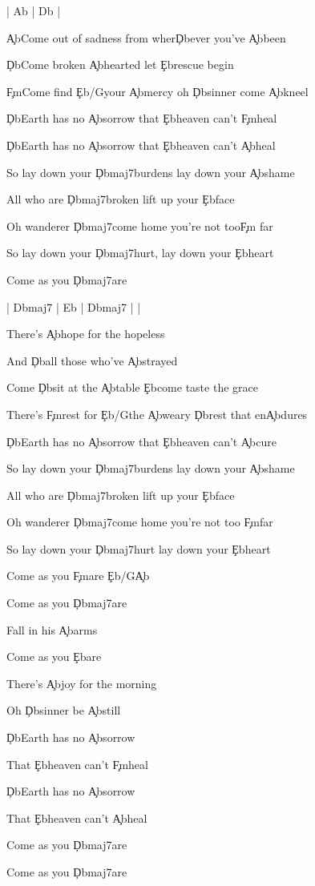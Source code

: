 \documentclass[9pt]{extarticle}
\begin{document}
\bsong

\bi
| Ab | Db |
\ei

\bv
\c{Ab}Come out of sadness from wher\c{Db}ever you've \c{Ab}been

\c{Db}Come broken \c{Ab}hearted let \c{Eb}rescue begin

\c{Fm}Come find \c{Eb/G}your \c{Ab}mercy oh \c{Db}sinner come \c{Ab}kneel

\c{Db}Earth has no \c{Ab}sorrow that \c{Eb}heaven can't \c{Fm}heal

\c{Db}Earth has no \c{Ab}sorrow that \c{Eb}heaven can't \c{Ab}heal
\ev

\bc
So lay down your \c{Dbmaj7}burdens lay down your \c{Ab}shame

All who are \c{Dbmaj7}broken lift up your \c{Eb}face

Oh wanderer \c{Dbmaj7}come home you're not too\c{Fm} far

So lay down your \c{Dbmaj7}hurt, lay down your \c{Eb}heart

Come as you \c{Dbmaj7}are
\ec

\bin
| Dbmaj7 | Eb | Dbmaj7 |  |
\ein

\bv
There's \c{Ab}hope for the hopeless

And \c{Db}all those who've \c{Ab}strayed

Come \c{Db}sit at the \c{Ab}table \c{Eb}come taste the grace

There's \c{Fm}rest for \c{Eb/G}the \c{Ab}weary \c{Db}rest that en\c{Ab}dures

\c{Db}Earth has no \c{Ab}sorrow that \c{Eb}heaven can't \c{Ab}cure
\ev

\bc
So lay down your \c{Dbmaj7}burdens lay down your \c{Ab}shame

All who are \c{Dbmaj7}broken lift up your \c{Eb}face

Oh wanderer \c{Dbmaj7}come home you're not too \c{Fm}far

So lay down your \c{Dbmaj7}hurt lay down your \c{Eb}heart

Come as you \c{Fm}are \c{Eb/G}\c{Ab}

Come as you \c{Dbmaj7}are

Fall in his \c{Ab}arms

Come as you \c{Eb}are
\ec

\bv
There's \c{Ab}joy for the morning

Oh \c{Db}sinner be \c{Ab}still

\c{Db}Earth has no \c{Ab}sorrow

That \c{Eb}heaven can't \c{Fm}heal

\c{Db}Earth has no \c{Ab}sorrow

That \c{Eb}heaven can't \c{Ab}heal
\ev


\bo
Come as you \c{Dbmaj7}are

Come as you \c{Dbmaj7}are
\eo

\esong
\end{document}
